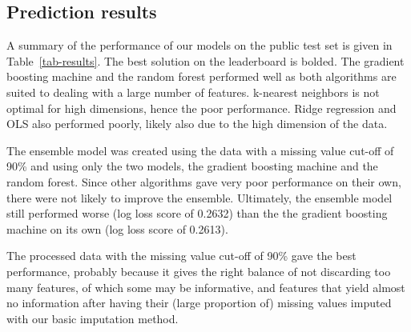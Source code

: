 \documentclass{article}\usepackage[]{graphicx}\usepackage[]{color}
\begin{document}
                                                                                                                                                                                                                                                                                                                                                                                                                                                                                                                                                                                                                                                                                                                                                                                                                                                                                                                                                                                                                                                                                                                                                        \subsection{Prediction results}
A summary of the performance of our models on the public test set is given in Table~\ref{tab-results}. The best solution on the leaderboard is bolded. The gradient boosting machine and the random forest performed well as both algorithms are suited to dealing with a large number of features. k-nearest neighbors is not optimal for high dimensions, hence the poor performance. Ridge regression and OLS also performed poorly, likely also due to the high dimension of the data.

The ensemble model was created using the data with a missing value cut-off of 90\% and using only the two models, the gradient boosting machine and the random forest. Since other algorithms gave very poor performance on their own, there were not likely to improve the ensemble. Ultimately, the ensemble model still performed worse (log loss score of 0.2632) than the the gradient boosting machine on its own (log loss score of 0.2613). 

The processed data with the missing value cut-off of 90\% gave the best performance, probably because it gives the right balance of not discarding too many features, of which some may be informative, and features that yield almost no information after having their (large proportion of) missing values imputed with our basic imputation method.
                                                                                                                                                                                                                                                                                                                                                                                                                                                                                                                                                                                                
\end{document}
